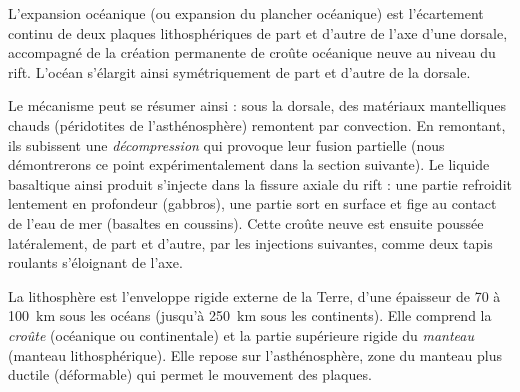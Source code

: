 \documentclass[11pt]{article}
\newcommand{\cle}[1]{{\popxbold\color{popdark}#1}}
\begin{document}
\begin{definition}
L'\cle{expansion océanique} (ou expansion du plancher océanique) est l'écartement continu de deux plaques lithosphériques de part et d'autre de l'axe d'une dorsale, accompagné de la création permanente de croûte océanique neuve au niveau du rift. L'océan s'élargit ainsi symétriquement de part et d'autre de la dorsale.
\end{definition}

Le mécanisme peut se résumer ainsi : sous la dorsale, des matériaux \cle{mantelliques chauds} (péridotites de l'asthénosphère) remontent par convection. En remontant, ils subissent une \emph{décompression} qui provoque leur fusion partielle (nous démontrerons ce point expérimentalement dans la section suivante). Le liquide basaltique ainsi produit s'injecte dans la fissure axiale du rift : une partie refroidit lentement en profondeur (gabbros), une partie sort en surface et fige au contact de l'eau de mer (basaltes en coussins). Cette croûte neuve est ensuite poussée latéralement, de part et d'autre, par les injections suivantes, comme deux tapis roulants s'éloignant de l'axe.

\begin{definition}[La lithosphère]
La \cle{lithosphère} est l'enveloppe rigide externe de la Terre, d'une épaisseur de 70 à \SI{100}{km} sous les océans (jusqu'à \SI{250}{km} sous les continents). Elle comprend la \emph{croûte} (océanique ou continentale) et la partie supérieure rigide du \emph{manteau} (manteau lithosphérique). Elle repose sur l'\cle{asthénosphère}, zone du manteau plus ductile (déformable) qui permet le mouvement des plaques.
\end{definition}
\end{document}
